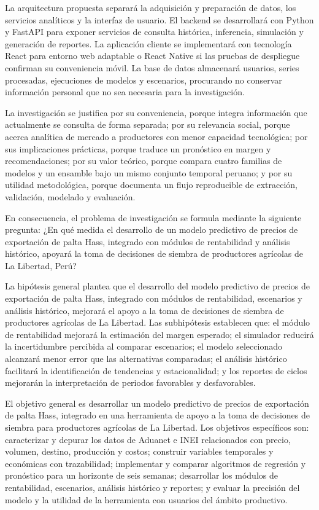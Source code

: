 La arquitectura propuesta separará la adquisición y preparación de datos, los servicios analíticos y la interfaz de usuario. El backend se desarrollará con Python y FastAPI para exponer servicios de consulta histórica, inferencia, simulación y generación de reportes. La aplicación cliente se implementará con tecnología React para entorno web adaptable o React Native si las pruebas de despliegue confirman su conveniencia móvil. La base de datos almacenará usuarios, series procesadas, ejecuciones de modelos y escenarios, procurando no conservar información personal que no sea necesaria para la investigación.

La investigación se justifica por su conveniencia, porque integra información que actualmente se consulta de forma separada; por su relevancia social, porque acerca analítica de mercado a productores con menor capacidad tecnológica; por sus implicaciones prácticas, porque traduce un pronóstico en margen y recomendaciones; por su valor teórico, porque compara cuatro familias de modelos y un ensamble bajo un mismo conjunto temporal peruano; y por su utilidad metodológica, porque documenta un flujo reproducible de extracción, validación, modelado y evaluación.

En consecuencia, el problema de investigación se formula mediante la siguiente pregunta: ¿En qué medida el desarrollo de un modelo predictivo de precios de exportación de palta Hass, integrado con módulos de rentabilidad y análisis histórico, apoyará la toma de decisiones de siembra de productores agrícolas de La Libertad, Perú?

La hipótesis general plantea que el desarrollo del modelo predictivo de precios de exportación de palta Hass, integrado con módulos de rentabilidad, escenarios y análisis histórico, mejorará el apoyo a la toma de decisiones de siembra de productores agrícolas de La Libertad. Las subhipótesis establecen que: el módulo de rentabilidad mejorará la estimación del margen esperado; el simulador reducirá la incertidumbre percibida al comparar escenarios; el modelo seleccionado alcanzará menor error que las alternativas comparadas; el análisis histórico facilitará la identificación de tendencias y estacionalidad; y los reportes de ciclos mejorarán la interpretación de periodos favorables y desfavorables.

El objetivo general es desarrollar un modelo predictivo de precios de exportación de palta Hass, integrado en una herramienta de apoyo a la toma de decisiones de siembra para productores agrícolas de La Libertad. Los objetivos específicos son: caracterizar y depurar los datos de Aduanet e INEI relacionados con precio, volumen, destino, producción y costos; construir variables temporales y económicas con trazabilidad; implementar y comparar algoritmos de regresión y pronóstico para un horizonte de seis semanas; desarrollar los módulos de rentabilidad, escenarios, análisis histórico y reportes; y evaluar la precisión del modelo y la utilidad de la herramienta con usuarios del ámbito productivo.


